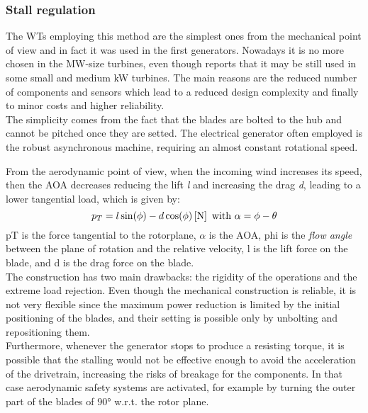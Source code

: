 \subsubsection{Stall regulation}\label{subsec:stall_regulation_theory}
The \acrshort{WTs} employing this method are the simplest ones from the mechanical point of view and in fact it was used in the first generators. Nowadays it is no more chosen in the MW-size turbines, even though \cite{Grasso_2016} reports that it may be still used in some small and medium kW turbines. The main reasons are the reduced number of components and sensors which lead to a reduced design complexity and finally to minor costs and higher reliability. \\
The simplicity comes from the fact that the blades are bolted to the hub and cannot be pitched once they are setted. The electrical generator often employed is the robust asynchronous machine, requiring an almost constant rotational speed.

From the aerodynamic point of view, when the incoming wind increases its speed, then the \acrshort{AOA} decreases reducing the lift \textit{l} and increasing the drag \textit{d}, leading to a lower tangential load, which is given by:
\begin{equation}
  p_T = l \sin(\phi) - d \cos(\phi) \left[\si{\newton}\right] \text{ with } \alpha = \phi - \theta
  \label{eq:tangential_load}
\end{equation}
\acrshort{pT} is the force tangential to the rotorplane, $\alpha$ is the \acrshort{AOA}, \acrshort{phi} is the \textit{flow angle} between the plane of rotation and the relative velocity, \acrshort{l} is the lift force on the blade, and \acrshort{d} is the drag force on the blade.\\ 
The construction has two main drawbacks: the rigidity of the operations and the extreme load rejection. Even though the mechanical construction is reliable, it is not very flexible since the maximum power reduction is limited by the initial positioning of the blades, and their setting is possible only by unbolting and repositioning them.\\
Furthermore, whenever the generator stops to produce a resisting torque, it is possible that the stalling would not be effective enough to avoid the acceleration of the drivetrain, increasing the risks of breakage for the components. In that case aerodynamic safety systems are activated, for example by turning the outer part of the blades of 90$\si{\degree}$ w.r.t. the rotor plane. 


